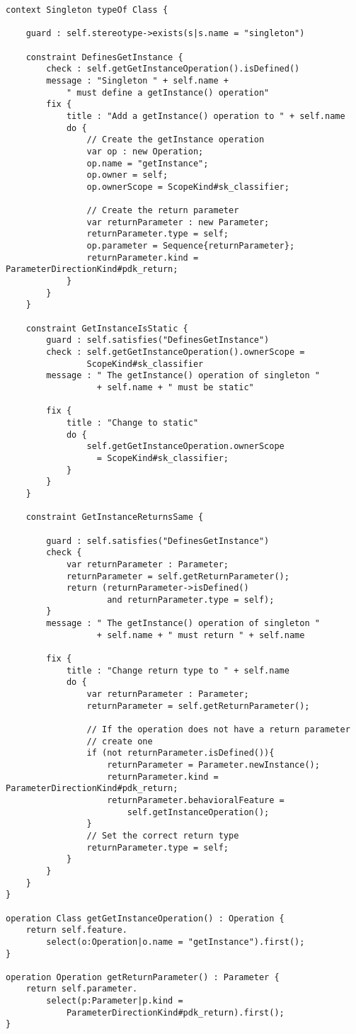 \begin{lstlisting}[basicstyle=\ttfamily\footnotesize, flexiblecolumns=true, numbers=none, nolol=true, caption=EVL Module for Validating Singletons, label=lst:CaseStudy, numbers=left, language=EVL, tabsize=2]
context Singleton typeOf Class {
	
	guard : self.stereotype->exists(s|s.name = "singleton")
	
	constraint DefinesGetInstance {
		check : self.getGetInstanceOperation().isDefined()
		message : "Singleton " + self.name + 
			" must define a getInstance() operation"
		fix {
			title : "Add a getInstance() operation to " + self.name
			do {
				// Create the getInstance operation
				var op : new Operation;
				op.name = "getInstance";
				op.owner = self;
				op.ownerScope = ScopeKind#sk_classifier;
				
				// Create the return parameter
				var returnParameter : new Parameter;
				returnParameter.type = self;
				op.parameter = Sequence{returnParameter};
				returnParameter.kind = ParameterDirectionKind#pdk_return;
			}
		}
	}
	
	constraint GetInstanceIsStatic {
		guard : self.satisfies("DefinesGetInstance")
		check : self.getGetInstanceOperation().ownerScope = 
		        ScopeKind#sk_classifier
		message : " The getInstance() operation of singleton " 
		          + self.name + " must be static"
	
		fix {
			title : "Change to static"
			do {
				self.getGetInstanceOperation.ownerScope 
				  = ScopeKind#sk_classifier;
			}
		}
	}
	
	constraint GetInstanceReturnsSame {
	
		guard : self.satisfies("DefinesGetInstance")
		check {
			var returnParameter : Parameter;
			returnParameter = self.getReturnParameter();
			return (returnParameter->isDefined() 
			        and returnParameter.type = self);
		}
		message : " The getInstance() operation of singleton " 
		          + self.name + " must return " + self.name
			
		fix {
			title : "Change return type to " + self.name
			do {
				var returnParameter : Parameter;
				returnParameter = self.getReturnParameter();
				
				// If the operation does not have a return parameter
				// create one
				if (not returnParameter.isDefined()){
					returnParameter = Parameter.newInstance();
					returnParameter.kind = ParameterDirectionKind#pdk_return;
					returnParameter.behavioralFeature = 
						self.getInstanceOperation();
				}
				// Set the correct return type
				returnParameter.type = self;
			}
		}
	}
}

operation Class getGetInstanceOperation() : Operation {
	return self.feature.
		select(o:Operation|o.name = "getInstance").first();
}

operation Operation getReturnParameter() : Parameter {
	return self.parameter.
		select(p:Parameter|p.kind = 
			ParameterDirectionKind#pdk_return).first();
}
\end{lstlisting}